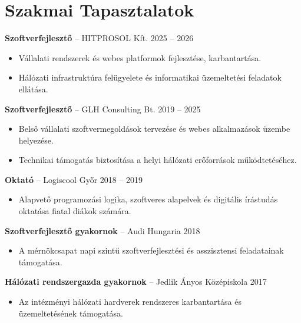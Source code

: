 \documentclass[11pt,a4paper]{article}
\begin{document}
\section{Szakmai Tapasztalatok}

\textbf{Szoftverfejlesztő} -- HITPROSOL Kft. \hfill 2025 -- 2026
\begin{itemize}[noitemsep,topsep=2pt,leftmargin=0.15in]
    \item Vállalati rendszerek és webes platformok fejlesztése, karbantartása.
    \item Hálózati infrastruktúra felügyelete és informatikai üzemeltetési feladatok ellátása.
\end{itemize}

\vspace{4pt}
\textbf{Szoftverfejlesztő} -- GLH Consulting Bt. \hfill 2019 -- 2025
\begin{itemize}[noitemsep,topsep=2pt,leftmargin=0.15in]
    \item Belső vállalati szoftvermegoldások tervezése és webes alkalmazások üzembe helyezése.
    \item Technikai támogatás biztosítása a helyi hálózati erőforrások működtetéséhez.
\end{itemize}

\vspace{4pt}
\textbf{Oktató} -- Logiscool Győr \hfill 2018 -- 2019
\begin{itemize}[noitemsep,topsep=2pt,leftmargin=0.15in]
    \item Alapvető programozási logika, szoftveres alapelvek és digitális írástudás oktatása fiatal diákok számára.
\end{itemize}

\vspace{4pt}
\textbf{Szoftverfejlesztő gyakornok} -- Audi Hungaria \hfill 2018
\begin{itemize}[noitemsep,topsep=2pt,leftmargin=0.15in]
    \item A mérnökcsapat napi szintű szoftverfejlesztési és asszisztensi feladatainak támogatása.
\end{itemize}

\vspace{4pt}
\textbf{Hálózati rendszergazda gyakornok} -- Jedlik Ányos Középiskola \hfill 2017
\begin{itemize}[noitemsep,topsep=2pt,leftmargin=0.15in]
    \item Az intézményi hálózati hardverek rendszeres karbantartása és üzemeltetésének támogatása.
\end{itemize}
\end{document}
